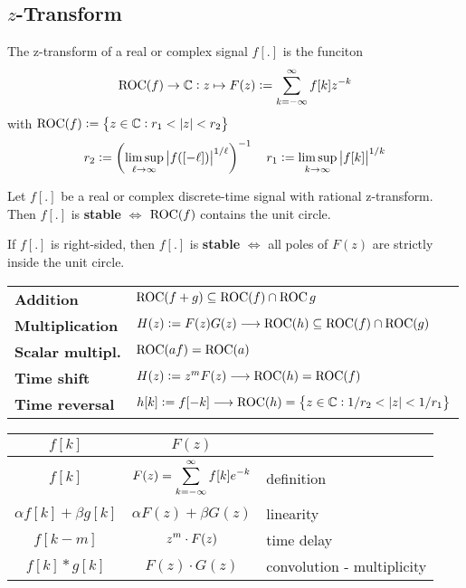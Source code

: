 \documentclass{article}
\begin{document}
\begin{twocolumn}
\subsection{$z$-Transform}

\begin{definition}
	The z-transform of a real or complex signal $f[.]$ is the funciton
	$$\operatorname{ROC}(f) \rightarrow \mathbb{C} : z \mapsto F(z) := \sum_{k = -\infty}^{\infty}f[k] z^{-k}$$
	with $\operatorname{ROC}(f) := \left\{ z \in \mathbb{C}: r_1 < \left| z \right| < r_2 \right\}$
	$$r_2 := \left( \limsup_{\ell \rightarrow \infty} \left| f([-\ell]) \right|^{1/\ell}\right)^{-1} \quad r_1 := \limsup_{k \rightarrow \infty} \left| f[k] \right|^{1/k}$$	
\end{definition}

\begin{theorem}
	Let $f[.]$ be a real or complex discrete-time signal with rational z-transform. Then $f[.]$ is \textbf{stable}  $\iff$ $\operatorname{ROC}(f)$ contains the unit circle.
	
	If $f[.]$ is right-sided, then $f[.]$ is \textbf{stable} $\iff$ all poles of $F(z)$ are strictly inside the unit circle.
\end{theorem}

\begin{tabular}{ll}
	\textbf{Addition} & $\operatorname{ROC}(f + g) \subseteq \operatorname{ROC}(f) \cap \operatorname{ROC}{g}$ \\
	\textbf{Multiplication} & $H(z) := F(z) G(z) \longrightarrow \operatorname{ROC}(h) \subseteq \operatorname{ROC}(f) \cap \operatorname{ROC}(g)$ \\
	\textbf{Scalar multipl.} & $\operatorname{ROC}(af) = \operatorname{ROC}(a)$ \\
	\textbf{Time shift} & $H(z) := z^m F(z) \longrightarrow \operatorname{ROC}(h) =\operatorname{ROC}(f)$ \\
	\textbf{Time reversal} & $h[k] := f[-k] \longrightarrow \operatorname{ROC}(h) = \left\{ z \in \mathbb{C}: 1/r_2 < \left| z \right| < 1/r_1\right\}$
\end{tabular}

\begin{center}
	\begin{tabular}{ccl}
		$f[k]$ & $F(z)$ & \\ \midrule
		$f[k]$ & $\displaystyle F(z) = \sum_{k = -\infty}^{\infty} f[k] e^{-k}$ & definition \\
		$\alpha f[k] + \beta g[k]$ & $\alpha F(z) + \beta G(z)$ & linearity \\
		$f[k-m]$ & $\displaystyle z^m \cdot F(z)$ & time delay \\
		$f[k] \ast g[k]$ & $F(z) \cdot G(z)$ & convolution - multiplicity \\
		

\end{tabular}
\end{center}
\end{twocolumn}
\end{document}
